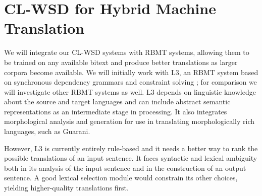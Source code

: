 \section{CL-WSD for Hybrid Machine Translation}
We will integrate our CL-WSD systems with RBMT systems, allowing them
to be trained on any available bitext and produce better translations as larger
corpora become available.
We will initially work with L3, an RBMT system based on synchronous dependency
grammars and constraint solving \cite{gasser:sxdg,gasser:aflat2012};
for comparison we will investigate other RBMT systems as well. L3
depends on linguistic knowledge about the source and target languages and can
include abstract semantic representations as an intermediate stage in
processing. It also integrates morphological analysis and generation for
use in translating morphologically rich languages, such as Guarani.

However, L3 is currently entirely rule-based and it needs a better way to rank
the possible translations of an input sentence. It faces syntactic and lexical
ambiguity both in its analysis of the input sentence and in the construction of
an output sentence.  A good lexical selection module would constrain its other
choices, yielding higher-quality translations first.

